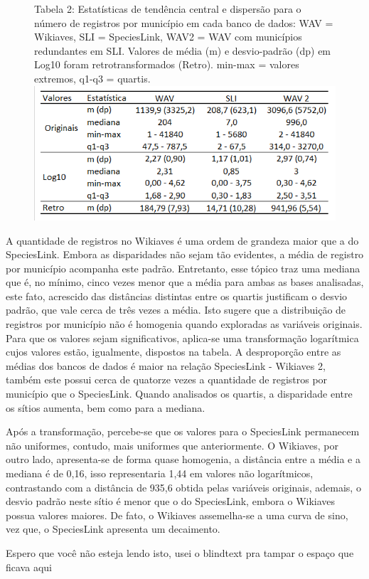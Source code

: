 \begin{figure}[h!]
\centering
{\scriptsize Tabela 2: Estatísticas de tendência central e dispersão para o número de registros por município em cada banco de dados: WAV = Wikiaves, SLI = SpeciesLink, WAV2 = WAV com municípios redundantes em SLI. Valores de média (m) e desvio-padrão (dp) em Log10 foram retrotransformados (Retro). min-max = valores extremos, q1-q3 = quartis.}
\includegraphics{Imagens/T02.png}
\end{figure}

\newpage

\begin{resposta}
A quantidade de registros no Wikiaves é uma ordem de grandeza maior que a do SpeciesLink. Embora as disparidades não sejam tão evidentes, a média de registro por município acompanha este padrão. Entretanto, esse tópico traz uma mediana que é, no mínimo, cinco vezes menor que a média para ambas as bases analisadas, este fato, acrescido das distâncias distintas entre os quartis justificam o desvio padrão, que vale cerca de três vezes a média. Isto sugere que a distribuição de registros por município não é homogenia quando exploradas as variáveis originais. Para que os valores sejam significativos, aplica-se uma transformação logarítmica cujos valores estão, igualmente, dispostos na tabela. A desproporção entre as médias dos bancos de dados é maior na relação SpeciesLink - Wikiaves 2, também este possui cerca de quatorze vezes a quantidade de registros por município que o SpeciesLink. Quando analisados os quartis, a disparidade entre os sítios aumenta, bem como para a mediana. 

Após a transformação, percebe-se que os valores para o SpeciesLink permanecem não uniformes, contudo, mais uniformes que anteriormente. O Wikiaves, por outro lado, apresenta-se de forma quase homogenia, a distância entre a média e a mediana é de 0,16, isso representaria 1,44 em valores não logarítmicos, contrastando com a distância de 935,6 obtida pelas variáveis originais, ademais, o desvio padrão neste sítio é menor que o do SpeciesLink, embora o Wikiaves possua valores maiores. De fato, o Wikiaves assemelha-se a uma curva de sino, vez que, o SpeciesLink apresenta um decaimento.

Espero que você não esteja lendo isto, usei o blindtext pra tampar o espaço que ficava aqui \blindtext 

\end{resposta}

